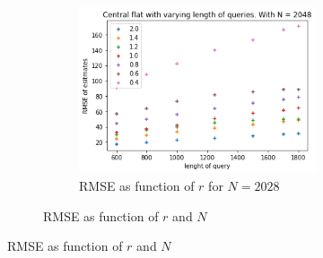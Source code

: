 \documentclass[11pt]{article}
\theoremstyle{definition}
\begin{document}
\begin{figure}[H]
\begin{subfigure}{.4\textwidth}
\begin{subfigure}{\textwidth}
  \includegraphics[width=\linewidth]{figures/central_flat/varying_r/cen_flat_varying_length_N=2048.png}
  \caption{RMSE as function of $r$ for $N=2028$}
  \label{fig:a}
\end{subfigure}
\caption{RMSE as function of $r$ and $N$}
\label{fig:b}
\end{subfigure}
\caption{RMSE as function of $r$ and $N$}
\label{fig:a}
\end{figure}
\end{document}
